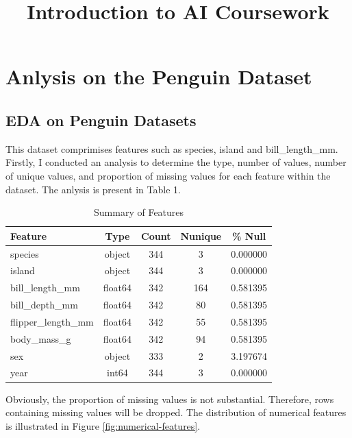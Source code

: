 \documentclass[a4paper,11pt]{article}
\begin{document}
	
\title{Introduction to AI Coursework}
\date{}
\maketitle




\section{Anlysis on the Penguin Dataset}

\subsection{EDA on Penguin Datasets}
This dataset comprimises features such as species, island and bill\_length\_mm. Firstly, I conducted an analysis 
to determine the type, number of values, number of unique values, and proportion of missing values for each feature within the dataset. The
anlysis is present in Table 1.

\begin{table}[h]
	\centering
	\caption{Summary of Features}
	\begin{tabular}{lcccc}
		\toprule
		Feature & Type & Count & Nunique & \% Null \\
		\midrule
		species & object & 344 & 3 & 0.000000 \\
		island & object & 344 & 3 & 0.000000 \\
		bill\_length\_mm & float64 & 342 & 164 & 0.581395 \\
		bill\_depth\_mm & float64 & 342 & 80 & 0.581395 \\
		flipper\_length\_mm & float64 & 342 & 55 & 0.581395 \\
		body\_mass\_g & float64 & 342 & 94 & 0.581395 \\
		sex & object & 333 & 2 & 3.197674 \\
		year & int64 & 344 & 3 & 0.000000 \\
		\bottomrule
	\end{tabular}
\end{table}
Obviously, the proportion of missing values is not substantial. Therefore, rows containing missing values will be dropped.
The distribution of numerical features is illustrated in Figure \ref{fig:numerical-features}.
\end{document}
